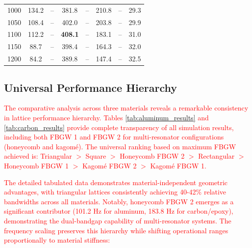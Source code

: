 \documentclass[review,numbers,sort&compress]{elsarticle}
\begin{document}
{\begin{table}[!htb]
\begin{tabular}{cccccccc}
1000 & 134.2 & -- & 381.8 & -- & 210.8 & -- & 29.3 \\
1050 & 108.4 & -- & 402.0 & -- & 203.8 & -- & 29.9 \\
1100 & 112.2 & -- & \textbf{408.1} & -- & 183.1 & -- & 31.0 \\
1150 & 88.7 & -- & 398.4 & -- & 164.3 & -- & 32.0 \\
1200 & 84.2 & -- & 389.8 & -- & 147.4 & -- & 32.5 \\
\hline
\end{tabular}
\end{table}}

\subsection{Universal Performance Hierarchy}

\textcolor{red}{The comparative analysis across three materials reveals a remarkable consistency in lattice performance hierarchy. Tables \ref{tab:aluminum_results} and \ref{tab:carbon_results} provide complete transparency of all simulation results, including both FBGW 1 and FBGW 2 for multi-resonator configurations (honeycomb and kagomé). The universal ranking based on maximum FBGW achieved is: Triangular $>$ Square $>$ Honeycomb FBGW 2 $>$ Rectangular $>$ Honeycomb FBGW 1 $>$ Kagomé FBGW 2 $>$ Kagomé FBGW 1.}

\textcolor{red}{The detailed tabulated data demonstrates material-independent geometric advantages, with triangular lattices consistently achieving 40-42\% relative bandwidths across all materials. Notably, honeycomb FBGW 2 emerges as a significant contributor (101.2 Hz for aluminum, 183.8 Hz for carbon/epoxy), demonstrating the dual-bandgap capability of multi-resonator systems. The frequency scaling preserves this hierarchy while shifting operational ranges proportionally to material stiffness:}
\end{document}

